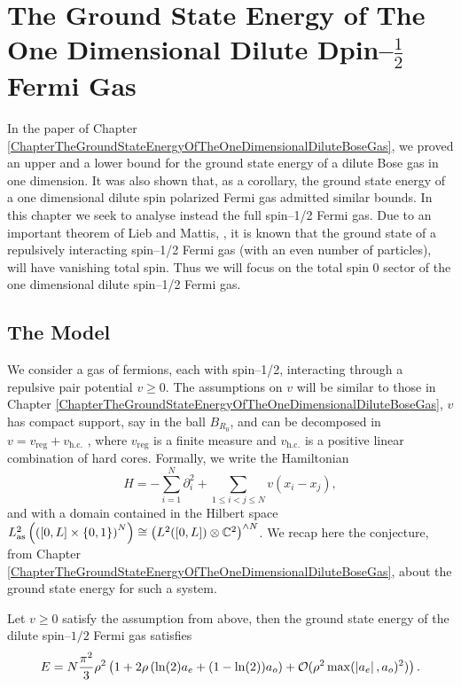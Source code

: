 \chapter{The Ground State Energy of The One Dimensional Dilute Dpin--$ \frac{1}{2} $ Fermi Gas}
\label{ChapterTheGroundStateEnergyOfTheOneDimensionalDiluteSpin1/2FermiGas}
In the paper of Chapter \ref{ChapterTheGroundStateEnergyOfTheOneDimensionalDiluteBoseGas}, we proved an upper and a lower bound for the ground state energy of a dilute Bose gas in one dimension. It was also shown that, as a corollary, the ground state energy of a one dimensional dilute spin polarized Fermi gas admitted similar bounds. In this chapter we seek to analyse instead the full spin--1/2 Fermi gas. Due to an important theorem of Lieb and Mattis, \cite{lieb1962theory}, it is known that the ground state of a repulsively interacting spin--1/2 Fermi gas (with an even number of particles), will have vanishing total spin. Thus we will focus on the total spin $ 0 $ sector of the one dimensional dilute spin--1/2 Fermi gas.
\section{The Model}
We consider a gas of fermions, each with spin--1/2, interacting through a repulsive pair potential $ v\geq 0 $. The assumptions on $ v $ will be similar to those in Chapter \ref{ChapterTheGroundStateEnergyOfTheOneDimensionalDiluteBoseGas}, \ie $ v $ has compact support, say in the ball $ B_{R_0} $, and can be decomposed in $ v=v_{\text{reg}}+v_{\text{h.c.}} $ , where $ v_{\text{reg}} $ is a finite measure and $ v_{\text{h.c.}} $ is a positive linear combination of hard cores. Formally, we write the Hamiltonian \begin{equation}\label{EqFermi1/2Hamiltonian}
H=-\sum_{i=1}^{N}\partial_i^2+\sum_{1\leq i<j\leq N} v(x_i-x_j),
\end{equation}
and with a domain contained in the Hilbert space $ L^2_{\text{as}}\left(\left([0,L]\times \{0,1\}\right)^N\right)\cong \left(L^2([0,L])\otimes \mathbb{C}^2\right)^{\wedge N} $.
We recap here the conjecture, from Chapter \ref{ChapterTheGroundStateEnergyOfTheOneDimensionalDiluteBoseGas}, about the ground state energy for such a system. \begin{conjecture}\label{ConjectureEqCSpin1/2FermiGroundStateEnergy}
	Let $ v\geq0 $ satisfy the assumption from above, then the ground state energy of the dilute spin--$ 1/2 $ Fermi gas satisfies\begin{equation}\label{EqConjectureEqCSpin1/2FermiGroundStateEnergy}
	E=N\frac{\pi^2}{3}\rho^2\left(1+2\rho \left(\ln(2) a_e+(1-\ln(2))a_o\right)+\mathcal{O}(\rho^2\max(\left\lvert a_e \right\rvert,a_o)^2)\right).
	\end{equation}
\end{conjecture}
